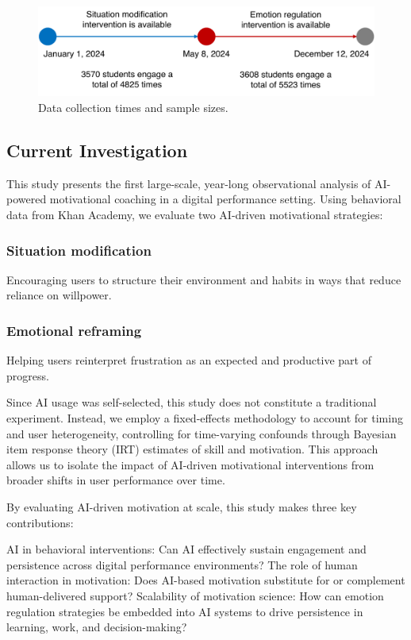 \documentclass[11pt]{report}
\begin{document}
\begin{mainf}
\begin{figure}
    \centering
    \includegraphics[width=0.95\linewidth]{sample.pdf}
    \caption{Data collection times and sample sizes.}
    \label{fig:sample}
\end{figure}


\subsection{Current Investigation}
This study presents the first large-scale, year-long observational analysis of AI-powered motivational coaching in a digital performance setting. 
Using behavioral data from Khan Academy, we evaluate two AI-driven motivational strategies:

\subsubsection{Situation modification} Encouraging users to structure their environment and habits in ways that reduce reliance on willpower.
\subsubsection{Emotional reframing} Helping users reinterpret frustration as an expected and productive part of progress.
 
Since AI usage was self-selected, this study does not constitute a traditional experiment. 
Instead, we employ a fixed-effects methodology to account for timing and user heterogeneity, controlling for time-varying confounds through Bayesian item response theory (IRT) estimates of skill and motivation. 
This approach allows us to isolate the impact of AI-driven motivational interventions from broader shifts in user performance over time.

By evaluating AI-driven motivation at scale, this study makes three key contributions:

AI in behavioral interventions: Can AI effectively sustain engagement and persistence across digital performance environments?
The role of human interaction in motivation: Does AI-based motivation substitute for or complement human-delivered support?
Scalability of motivation science: How can emotion regulation strategies be embedded into AI systems to drive persistence in learning, work, and decision-making?


\end{mainf}
\end{document}
